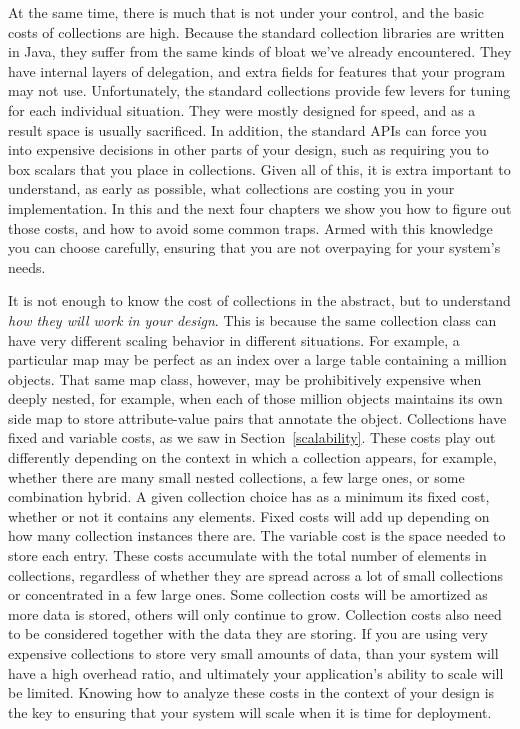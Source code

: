 At the same time, there is much that is not under your control, and the basic
costs of collections are high.  Because the standard collection libraries are
written in Java, they suffer from the same kinds of bloat we've already encountered. They have internal layers
of delegation, and extra fields for features that your program may not
use. Unfortunately, the standard collections provide few levers for
tuning for each individual situation. They were
mostly designed for speed, and as a result space is usually sacrificed. In
addition, the standard APIs can force you into expensive decisions in other
parts of your design, such as requiring you to box scalars that you place in
collections. Given all of this, it is extra important to understand, as early as possible,
what collections are costing you in your implementation. In this and
the next four chapters we show you how to figure out those costs, and how
to avoid some common traps. Armed with this
knowledge you can choose carefully, ensuring that you are not
overpaying for your system's needs.

It is not enough to know the cost
of collections in the abstract, but to understand \emph{how they will work in
your design}. This is because the same collection class can have very different
scaling behavior in different situations. For example, a particular map
may be perfect as an index over a large table containing a
million objects. That same map class, however, may be prohibitively expensive
when deeply nested, for example, when each of those
million objects maintains its own side map to store attribute-value pairs that
annotate the object.
Collections have fixed and variable costs, as we saw
in Section~\ref{scalability}. These costs play out differently
depending on the context in which a collection appears, for example, whether
there are many small nested collections, a few large ones, or some combination
hybrid.  A given collection choice has as a minimum its fixed cost,
whether or not it contains any elements. Fixed costs will add up depending on
how many collection instances there are. The variable cost is the space needed to store each entry. These
 costs accumulate with the total number of
elements in collections, regardless of whether they are spread across a lot of
small collections or concentrated in a few large ones. 
Some collection costs will be amortized as more data is stored, others will only
continue to grow. Collection costs also need to be considered together with the data they are
storing. If you are using very expensive collections to store very small amounts
of data, than your system will have a high overhead ratio, and ultimately your application's ability
to scale will be limited. 
Knowing how to analyze these costs in the context of your design
is the key to ensuring that your system will scale when it is time for
deployment.  

